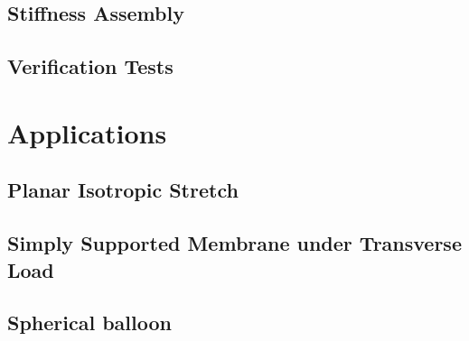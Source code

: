 \documentclass[../main.tex]{subfiles}
\begin{document}
\subsection{Stiffness Assembly}
\subsection{Verification Tests}

\section{Applications}
\subsection{Planar Isotropic Stretch}
\subsection{Simply Supported Membrane under Transverse Load}
\subsection{Spherical balloon}
\end{document}
